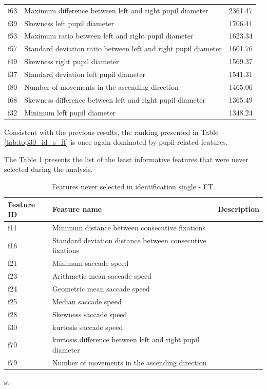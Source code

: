 \documentclass[12pt]{report}
\begin{document}
\begin{table}[htbp]
\begin{tabular}{lll}
f63 & Maximum difference between left and right pupil diameter & 2361.47 \\
f39 & Skewness left pupil diameter & 1706.41 \\
f53 & Maximum ratio between left and right pupil diameter & 1623.34 \\
f57 & Standard deviation ratio between left and right pupil diameter & 1601.76 \\
f49 & Skewness right pupil diameter & 1569.37 \\
f37 & Standard deviation left pupil diameter & 1541.31 \\
f80 & Number of movements in the ascending direction & 1465.06 \\
f68 & Skewness difference between left and right pupil diameter & 1365.49 \\
f32 & Minimum left pupil diameter & 1348.24 \\
\bottomrule
\end{tabular}
\end{table}

Consistent with the previous results, the ranking presented in Table \ref{tab:top30_id_s_ft} is once again dominated by pupil-related features.

The Table \ref{tab:never_selected_features_ft} presents the list of the least informative features that were never selected during the analysis.


\begin{table}[H]
\centering
\small
\setlength{\tabcolsep}{4pt} %
\caption{Features never selected in identification single - FT.}
\label{tab:never_selected_features_ft}
\begin{tabular}{lll}
\toprule
\textbf{Feature ID} & \textbf{Feature name} & \textbf{Description} \\
\midrule
f11 & Minimum distance between consecutive fixations \\
f16 & Standard deviation distance between consecutive fixations \\
f21 & Minimum saccade speed \\
f23 & Arithmetic mean saccade speed \\
f24 & Geometric mean saccade speed \\
f25 & Median saccade speed \\
f28 & Skewness saccade speed \\
f30 & kurtosis saccade speed \\
f70 & kurtosis difference between left and right pupil diameter \\
f79 & Number of movements in the ascending direction \\
\bottomrule
\end{tabular}st
\end{table}
\FloatBarrier
\end{document}

